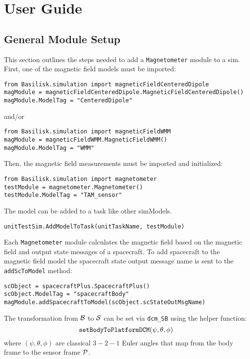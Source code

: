 
\section{User Guide}

\subsection{General Module Setup}
This section outlines the steps needed to add a {\tt Magnetometer} module to a sim. First, one of the magnetic field models must be imported:

\begin{verbatim}
from Basilisk.simulation import magneticFieldCenteredDipole
magModule = magneticFieldCenteredDipole.MagneticFieldCenteredDipole()
magModule.ModelTag = "CenteredDipole"
\end{verbatim}
and/or
\begin{verbatim}
from Basilisk.simulation import magneticFieldWMM
magModule = magneticFieldWMM.MagneticFieldWMM()
magModule.ModelTag = "WMM"
\end{verbatim}

Then, the magnetic field measurements must be imported and initialized:

\begin{verbatim}
from Basilisk.simulation import magnetometer
testModule = magnetometer.Magnetometer()
testModule.ModelTag = "TAM_sensor"
\end{verbatim}

The model can  be added to a task like other simModels. 

\begin{verbatim}
unitTestSim.AddModelToTask(unitTaskName, testModule)
\end{verbatim}

Each {\tt Magnetometer} module calculates the magnetic field based on the magnetic field and output state messages of a spacecraft.
To add spacecraft to the magnetic field model the spacecraft state output message name is sent to the \verb|addScToModel| method:

\begin{verbatim}
scObject = spacecraftPlus.SpacecraftPlus()
scObject.ModelTag = "spacecraftBody"
magModule.addSpacecraftToModel(scObject.scStateOutMsgName)
\end{verbatim}

The transformation from $\cal B$ to $\cal S$ can be set via {\tt dcm\_SB} using the helper function:
$$
	{\tt setBodyToPlatformDCM}(\psi, \theta, \phi)
$$
where $(\psi, \theta, \phi)$ are classical $3-2-1$ Euler angles that map from the body frame to the sensor frame $\cal P$. 

